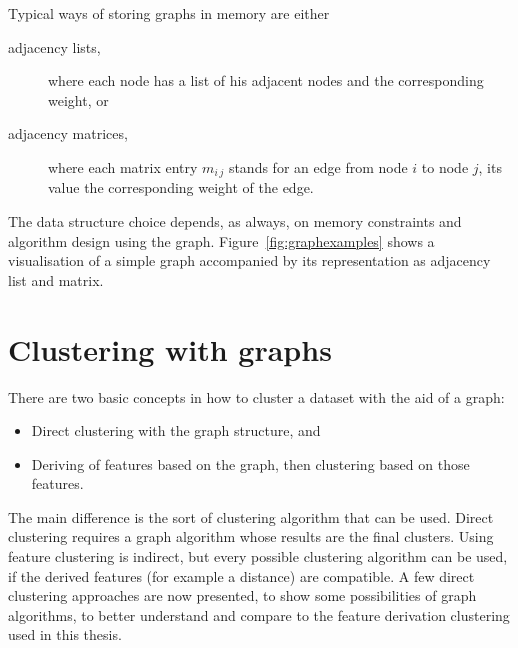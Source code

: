 Typical ways of storing graphs in memory are either
\begin{description}
\item[adjacency lists,] where each node has a list of his adjacent nodes and the corresponding weight, or
\item[adjacency matrices,] where each matrix entry $m_{i\,j}$ stands for an edge from node $i$ to node $j$, its value the corresponding weight of the edge.
\end{description}
%
The data structure choice depends, as always, on memory constraints and algorithm design using the graph. Figure~\ref{fig:graphexamples} shows a visualisation of a simple graph accompanied by its representation as adjacency list and matrix.



\section{Clustering with graphs}
There are two basic concepts in how to cluster a dataset with the aid of a graph:
\begin{itemize}
\item Direct clustering with the graph structure, and
\item Deriving of features based on the graph, then clustering based on those features.
\end{itemize}
%
The main difference is the sort of clustering algorithm that can be used. Direct clustering requires a graph algorithm whose results are the final clusters. Using feature clustering is indirect, but every possible clustering algorithm can be used, if the derived features (for example a distance) are compatible. A few direct clustering approaches are now presented, to show some possibilities of graph algorithms, to better understand and compare to the feature derivation clustering used in this thesis.

